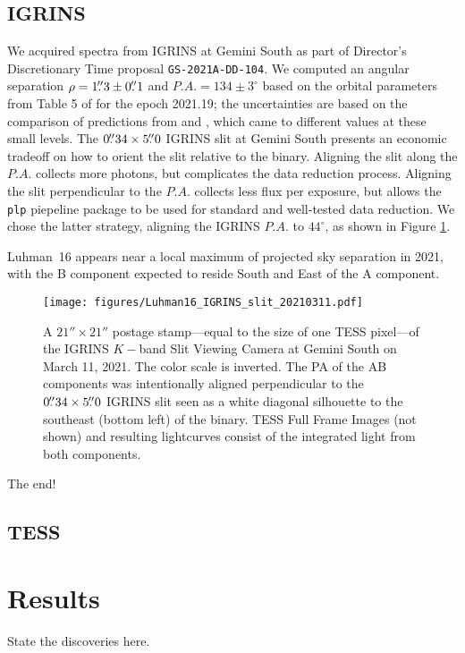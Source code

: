 \documentclass[modern]{aastex631}
\begin{document}
\subsection{IGRINS}
We acquired spectra from IGRINS \citep{park14,2018SPIE10702E..0QM} at Gemini South as part of Director's Discretionary Time proposal \texttt{GS-2021A-DD-104}.  We computed an angular separation $\rho = 1\mbox{$.\!\!^{\prime\prime}$}3 \pm 0 \mbox{$.\!\!^{\prime\prime}$} 1$ and $P.A. = 134 \pm 3^\circ$ based on the orbital parameters from Table 5 of \citet{2018A&A...618A.111L} for the epoch 2021.19; the uncertainties are based on the comparison of predictions from \citet{2017MNRAS.470.1140B} and \citet{2018A&A...618A.111L}, which came to different values at these small levels.  The $0\mbox{$.\!\!^{\prime\prime}$}34 \times 5\mbox{$.\!\!^{\prime\prime}$}0$ IGRINS slit at Gemini South presents an economic tradeoff on how to orient the slit relative to the binary.  Aligning the slit along the $P.A.$ collects more photons, but complicates the data reduction process.  Aligning the slit perpendicular to the $P.A.$ collects less flux per exposure, but allows the \texttt{plp} piepeline package \citep{jaejoonlee16} to be used for standard and well-tested data reduction.  We chose the latter strategy, aligning the IGRINS $P.A.$ to $44^\circ$, as shown in Figure \ref{fig:imaging}.

Luhman~16 appears near a local maximum of projected sky separation in 2021, with the B component expected to reside South and East of the A component.

\begin{figure*}[ht]
  \centering
    \texttt{[image: figures/Luhman16\_IGRINS\_slit\_20210311.pdf]} \\
\caption{A $21'' \times 21''$ postage stamp---equal to the size of one TESS pixel---of the IGRINS $K-$band Slit Viewing Camera at Gemini South on March 11, 2021.  The color scale is inverted.  The PA of the AB components was intentionally aligned perpendicular to the $0\mbox{$.\!\!^{\prime\prime}$}34 \times 5\mbox{$.\!\!^{\prime\prime}$}0$ IGRINS slit seen as a white diagonal silhouette to the southeast (bottom left) of the binary. TESS Full Frame Images (not shown) and resulting lightcurves consist of the integrated light from both components.}
\label{fig:imaging}
\end{figure*}

The end!


\subsection{TESS}


\section{Results}
State the discoveries here.
\end{document}
